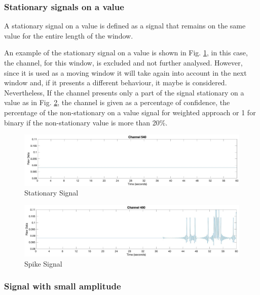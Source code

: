 \subsubsection*{Stationary signals on a value}\label{cap:stationary}
A stationary signal on a value is defined as a signal that remains on the same value for the entire length of the window.

An example of the stationary signal on a value is shown in Fig. \ref{fig:stationaryTotal}, in this case, the channel, for this window, is excluded and not further analysed.
However, since it is used as a moving window it will take again into account in the next window and, if it presents a different behaviour, it maybe is considered. 
Nevertheless, If the channel presents only a part of the signal stationary on a value as in Fig. \ref{fig:spikePartial}, the channel is given as a percentage of confidence, the percentage of the non-stationary on a value signal for weighted approach or 1 for binary if the non-stationary value is more than 20\%.
\vspace*{0.5cm}
\begin{figure}[H]
    \centering
    \includegraphics[width=\textwidth]{img/stationaryTotal.jpg}
    \caption{Stationary Signal}
    \label{fig:stationaryTotal}
\end{figure}

\begin{figure}[H]
    \centering
    \includegraphics[width=\textwidth]{img/spakePartial.jpg}
    \caption{Spike Signal}
    \label{fig:spikePartial}
\end{figure}

\subsubsection*{Signal with small amplitude}\label{cap:noisy}

